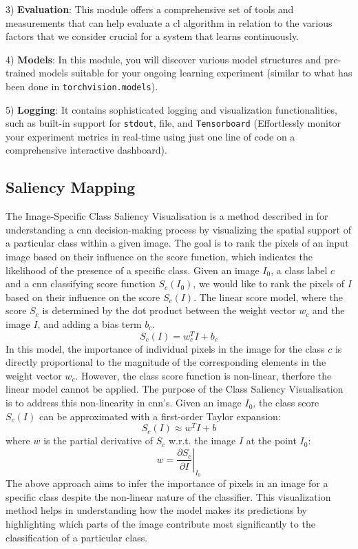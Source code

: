 3) \textbf{Evaluation}: This module offers a comprehensive set of tools and measurements that can help evaluate a \acrshort{cl} algorithm in relation to the various factors that we consider crucial for a system that learns continuously.

4) \textbf{Models}: In this module, you will discover various model structures and pre-trained models suitable for your ongoing learning experiment (similar to what has been done in \verb|torchvision.models|).

5) \textbf{Logging}: It contains sophisticated logging and visualization functionalities, such as built-in support for \verb|stdout|, file, and \verb|Tensorboard| (Effortlessly monitor your experiment metrics in real-time using just one line of code on a comprehensive interactive dashboard). 

\citep{lomonaco2021avalanche, carta2023avalanche}

\subsection{Saliency Mapping}
The Image-Specific Class Saliency Visualisation is a method described in \citep{simonyan2013deep} for understanding a \acrshort{cnn} decision-making process by visualizing the spatial support of a particular class within a given image. The goal is to rank the pixels of an input image based on their influence on the score function, which indicates the likelihood of the presence of a specific class.
Given an image $I_{0}$, a class label $c$ and a \acrshort{cnn} classifying score function $S_{c}(I_{0})$, we would like to rank the pixels of $I$ based on their influence on the score $S_{c}(I)$. 
The linear score model, where the score $S_{c}$ is determined by the dot product between the weight vector $w_{c}$ and the image $I$, and adding a bias term $b_{c}$. 
\[
S_{c}(I) = w_{c}^{T} I + b_{c}
\]
In this model, the importance of individual pixels in the image for the class $c$ is directly proportional to the magnitude of the corresponding elements in the weight vector $w_{c}$. However, the class score function is non-linear, therfore the linear model cannot be applied. 
The purpose of the Class Saliency Visualisation is to address this non-linearity in \acrshort{cnn}'s. Given an image $I_{0}$, the class score $S_{c}(I)$ can be approximated with a first-order Taylor expansion: 
\[
S_{c}(I) \approx w^{T} I + b
\]
where $w$ is the partial derivative of $S_{c}$ w.r.t. the image $I$ at the point $I_{0}$: 
\[
w = \left. \frac{\partial S_{c}}{\partial I} \right|_{I_{0}}
\]
The above approach aims to infer the importance of pixels in an image for a specific class despite the non-linear nature of the classifier. This visualization method helps in understanding how the model makes its predictions by highlighting which parts of the image contribute most significantly to the classification of a particular class. 

